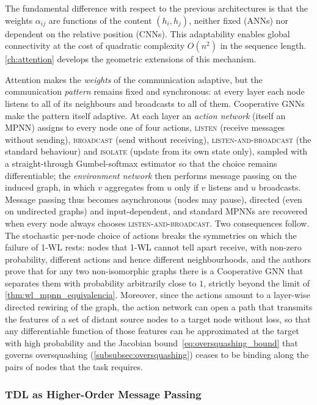 The fundamental difference with respect to the previous architectures is that the weights $\alpha_{ij}$ are functions of the content $(h_i, h_j)$, neither fixed (\glspl{ANN}) nor dependent on the relative position (\glspl{CNN}). This adaptability enables global connectivity at the cost of quadratic complexity $O(n^2)$ in the sequence length. \autoref{ch:attention} develops the geometric extensions of this mechanism.

Attention makes the \textit{weights} of the communication adaptive, but the communication \textit{pattern} remains fixed and synchronous: at every layer each node listens to all of its neighbours and broadcasts to all of them. Cooperative \glspl{GNN} \citep{finkelshtein2024cognn} make the pattern itself adaptive. At each layer an \textit{action network} (itself an \gls{MPNN}) assigns to every node one of four actions, \textsc{listen} (receive messages without sending), \textsc{broadcast} (send without receiving), \textsc{listen-and-broadcast} (the standard behaviour) and \textsc{isolate} (update from its own state only), sampled with a straight-through Gumbel-softmax estimator so that the choice remains differentiable; the \textit{environment network} then performs message passing on the induced graph, in which $v$ aggregates from $u$ only if $v$ listens and $u$ broadcasts. Message passing thus becomes asynchronous (nodes may pause), directed (even on undirected graphs) and input-dependent, and standard \glspl{MPNN} are recovered when every node always chooses \textsc{listen-and-broadcast}. Two consequences follow. The stochastic per-node choice of actions breaks the symmetries on which the failure of 1-WL rests: nodes that 1-WL cannot tell apart receive, with non-zero probability, different actions and hence different neighbourhoods, and the authors prove that for any two non-isomorphic graphs there is a Cooperative \gls{GNN} that separates them with probability arbitrarily close to $1$, strictly beyond the limit of \autoref{thm:wl_mpnn_equivalencia}. Moreover, since the actions amount to a layer-wise directed rewiring of the graph, the action network can open a path that transmits the features of a set of distant source nodes to a target node without loss, so that any differentiable function of those features can be approximated at the target with high probability and the Jacobian bound~\eqref{eq:oversquashing_bound} that governs \gls{oversquashing} (\autoref{subsubsec:oversquashing}) ceases to be binding along the pairs of nodes that the task requires.

\subsubsection{TDL as Higher-Order Message Passing}\label{subsubsec:tdl_mpnn_general}

